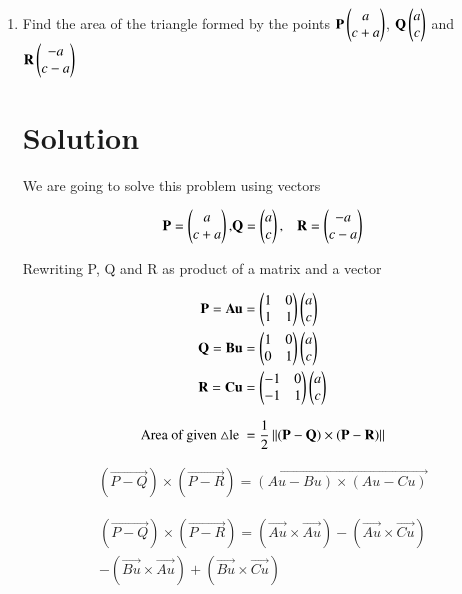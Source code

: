 \documentclass[journal,12pt,twocolumn]{IEEEtran}
\renewcommand\thesection{\arabic{section}}
\begin{document}
\begin{enumerate}[label=\thesection.\arabic*.,ref=\thesection.\theenumi]

\item Find the area of the triangle formed by the points $ \mathbf{P} \begin{pmatrix}a\\c+a\end{pmatrix}$, $\mathbf{Q} \begin{pmatrix}a\\c\end{pmatrix}$ and $\mathbf{R} \begin{pmatrix}-a\\c-a\end{pmatrix}$

\section{Solution}
We are going to solve this problem using vectors

\begin{align}
\mathbf{P}=\begin{pmatrix}a\\c+a\end{pmatrix},&\mathbf{Q} =\begin{pmatrix}a\\c\end{pmatrix},&\mathbf{R} =\begin{pmatrix}-a\\c-a\end{pmatrix}
\label{3}
\end{align}

Rewriting P, Q and R as product of a matrix and a vector

\begin{align}
\mathbf{P}=\mathbf{Au}&=\begin{pmatrix}1&0\\1&1\end{pmatrix}\begin{pmatrix}a\\c\end{pmatrix}\\
\mathbf{Q}=\mathbf{Bu}&=\begin{pmatrix}1&0\\0&1\end{pmatrix}\begin{pmatrix}a\\c\end{pmatrix}\\
\mathbf{R}=\mathbf{Cu}&=\begin{pmatrix}-1&0\\-1&1\end{pmatrix}\begin{pmatrix}a\\c\end{pmatrix}\\
\end{align}


\begin{multline}
\text{Area of given $\triangle$le }=\frac{1}{2}\norm{(\Vec{P-Q})\times(\Vec{P-R})}
\label{1}
\end{multline}

\begin{multline}
(\Vec{P-Q})\times(\Vec{P-R}) = \vec{(Au-Bu)\times(Au-Cu)}
\end{multline}

\begin{multline}
(\Vec{P-Q})\times(\Vec{P-R})=(\vec{Au}\times\vec{Au})-(\vec{Au}\times\vec{Cu})\\
-(\vec{Bu}\times\vec{Au})+(\vec{Bu}\times\vec{Cu})
\end{multline}


\end{enumerate}
\end{document}
